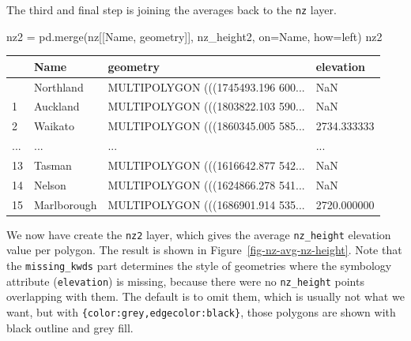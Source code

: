 \documentclass[
  letterpaper,
]{krantz}
\newenvironment{Shaded}{\begin{snugshade}}{\end{snugshade}}
\newcommand{\NormalTok}[1]{\textcolor[rgb]{0.00,0.23,0.31}{#1}}
\newcommand{\OperatorTok}[1]{\textcolor[rgb]{0.37,0.37,0.37}{#1}}
\newcommand{\StringTok}[1]{\textcolor[rgb]{0.13,0.47,0.30}{#1}}
\begin{document}
The third and final step is joining the averages back to the \texttt{nz}
layer.

\begin{Shaded}
\begin{Highlighting}[]
\NormalTok{nz2 }\OperatorTok{=}\NormalTok{ pd.merge(nz[[}\StringTok{\textquotesingle{}Name\textquotesingle{}}\NormalTok{, }\StringTok{\textquotesingle{}geometry\textquotesingle{}}\NormalTok{]], nz\_height2, on}\OperatorTok{=}\StringTok{\textquotesingle{}Name\textquotesingle{}}\NormalTok{, how}\OperatorTok{=}\StringTok{\textquotesingle{}left\textquotesingle{}}\NormalTok{)}
\NormalTok{nz2}
\end{Highlighting}
\end{Shaded}

\begin{longtable}[]{@{}llll@{}}
\toprule\noalign{}
& Name & geometry & elevation \\
\midrule\noalign{}
\endhead
\bottomrule\noalign{}
\endlastfoot
0 & Northland & MULTIPOLYGON (((1745493.196 600... & NaN \\
1 & Auckland & MULTIPOLYGON (((1803822.103 590... & NaN \\
2 & Waikato & MULTIPOLYGON (((1860345.005 585... & 2734.333333 \\
... & ... & ... & ... \\
13 & Tasman & MULTIPOLYGON (((1616642.877 542... & NaN \\
14 & Nelson & MULTIPOLYGON (((1624866.278 541... & NaN \\
15 & Marlborough & MULTIPOLYGON (((1686901.914 535... & 2720.000000 \\
\end{longtable}

We now have create the \texttt{nz2} layer, which gives the average
\texttt{nz\_height} elevation value per polygon. The result is shown in
Figure~\ref{fig-nz-avg-nz-height}. Note that the \texttt{missing\_kwds}
part determines the style of geometries where the symbology attribute
(\texttt{elevation}) is missing, because there were no
\texttt{nz\_height} points overlapping with them. The default is to omit
them, which is usually not what we want, but with
\texttt{\{\textquotesingle{}color\textquotesingle{}:\textquotesingle{}grey\textquotesingle{},\textquotesingle{}edgecolor\textquotesingle{}:\textquotesingle{}black\textquotesingle{}\}},
those polygons are shown with black outline and grey fill.
\end{document}
